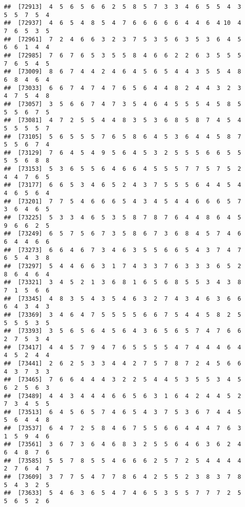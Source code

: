 \documentclass[
]{book}
\begin{document}
\begin{verbatim}
##  [72913]  4  5  6  5  6  6  2  5  8  5  7  3  3  4  6  5  5  4  3  5  5  7  5  4
##  [72937]  4  6  5  4  8  5  4  7  6  6  6  6  6  4  4  6  4 10  4  7  6  5  3  5
##  [72961]  7  2  4  6  6  3  2  3  7  5  3  5  6  3  5  3  6  4  5  6  6  1  4  4
##  [72985]  7  6  7  6  5  3  5  5  8  4  6  6  2  2  6  3  5  5  5  7  6  5  4  5
##  [73009]  8  6  7  4  4  2  4  6  4  5  6  5  4  4  3  5  5  4  8  6  8  4  6  4
##  [73033]  6  6  7  4  7  4  7  6  5  6  4  4  8  2  4  4  3  2  3  4  7  5  4  8
##  [73057]  3  5  6  6  7  4  7  3  5  4  6  4  5  5  5  4  5  8  5  5  5  6  7  5
##  [73081]  4  7  2  5  5  4  4  8  3  5  3  6  8  5  8  7  4  5  4  5  5  5  5  7
##  [73105]  5  6  5  5  5  7  6  5  8  6  4  5  3  6  4  4  5  8  7  5  5  6  7  4
##  [73129]  7  6  4  5  4  9  5  6  4  5  3  2  5  5  5  6  6  5  5  5  5  6  8  8
##  [73153]  5  3  6  5  5  6  4  6  6  4  5  5  5  7  7  5  7  5  2  4  4  7  6  5
##  [73177]  6  6  5  3  4  6  5  2  4  3  7  5  5  5  6  4  4  5  4  4  6  5  6  4
##  [73201]  7  7  5  4  6  6  6  5  4  3  4  5  4  4  6  6  6  5  7  3  6  4  6  5
##  [73225]  5  3  3  4  6  5  3  5  8  7  8  7  6  4  4  8  6  4  5  9  6  6  2  5
##  [73249]  6  5  7  5  6  7  3  5  8  6  7  3  6  8  4  5  7  4  6  6  4  4  6  6
##  [73273]  6  6  4  6  7  3  4  6  3  5  5  6  6  5  4  3  7  4  7  6  5  4  3  8
##  [73297]  5  4  4  6  6  3  1  7  4  3  3  7  6  3  3  3  6  5  2  8  6  4  6  4
##  [73321]  3  4  5  2  1  3  6  8  1  6  5  6  8  5  5  3  4  3  8  7  1  5  6  6
##  [73345]  4  8  3  5  4  3  5  4  6  3  2  7  4  3  4  6  3  6  6  6  4  3  4  3
##  [73369]  3  4  6  4  7  5  5  5  5  6  6  7  5  4  4  5  8  2  5  5  5  5  3  5
##  [73393]  3  5  6  5  6  4  5  6  4  3  6  5  6  5  7  4  7  6  6  2  7  5  3  4
##  [73417]  4  4  5  7  9  4  7  6  5  5  5  5  4  7  4  4  4  6  4  4  5  2  4  4
##  [73441]  2  6  2  5  3  3  4  4  2  7  5  7  8  7  2  4  5  6  6  4  3  7  3  3
##  [73465]  7  6  6  4  4  4  3  2  2  5  4  4  5  3  5  5  3  4  5  6  2  5  6  3
##  [73489]  4  4  3  4  4  4  6  6  5  6  3  1  6  4  2  4  4  5  2  7  3  4  5  5
##  [73513]  6  4  5  6  5  7  4  6  5  4  3  7  5  3  6  7  4  4  5  5  6  4  4  8
##  [73537]  6  4  7  2  5  8  4  6  7  5  5  6  6  4  4  4  7  6  3  1  5  9  4  6
##  [73561]  3  6  7  3  6  4  6  8  3  2  5  5  6  4  6  3  6  2  4  6  4  8  7  6
##  [73585]  5  5  7  8  5  5  4  6  6  6  2  5  7  2  5  4  4  4  4  2  7  6  4  7
##  [73609]  3  7  7  5  4  7  7  8  6  4  2  5  5  2  3  8  3  7  8  5  4  3  2  5
##  [73633]  5  4  6  3  6  5  4  7  4  6  5  3  5  5  7  7  7  2  5  5  6  5  2  6

\end{verbatim}
\end{document}
